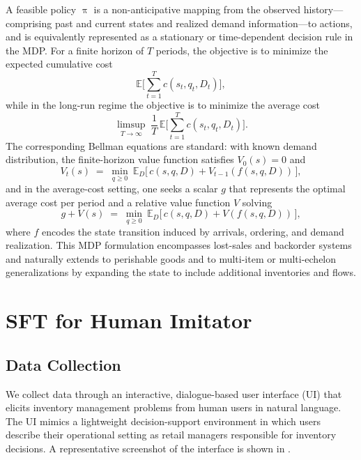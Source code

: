 \documentclass[mnsc,nonblindrev]{informs3_hide}
\newcommand{\policy}{\ensuremath{\uppi}}
\begin{document}
\begin{APPENDICES}
A feasible policy $\policy$ is a non-anticipative mapping from the observed history—comprising past and current states and realized demand information—to actions, and is equivalently represented as a stationary or time-dependent decision rule in the MDP. For a finite horizon of $T$ periods, the objective is to minimize the expected cumulative cost 
$$
\mathds{E}\Bigg[\sum_{t=1}^T c(s_t, q_t, D_t)\Bigg],
$$ 
while in the long-run regime the objective is to minimize the average cost 
\[
\limsup_{T\to\infty} \; \frac{1}{T} \,\mathds{E}\Bigg[\sum_{t=1}^T c(s_t, q_t, D_t)\Bigg].
\]
The corresponding Bellman equations are standard: with known demand distribution, the finite-horizon value function satisfies $V_0(s) = 0$ and
\[
V_t(s) \;=\; \min_{q \ge 0} \ \mathds{E}_D\big[\, c(s, q, D) + V_{t-1}(f(s, q, D)) \,\big],
\]
and in the average-cost setting, one seeks a scalar $g$ that represents the optimal average cost per period and a relative value function $V$ solving
\[
g + V(s) \;=\; \min_{q \ge 0} \ \mathds{E}_D\big[\, c(s, q, D) + V(f(s, q, D)) \,\big],
\]
where $f$ encodes the state transition induced by arrivals, ordering, and demand realization. This MDP formulation encompasses lost-sales and backorder systems and naturally extends to perishable goods and to multi-item or multi-echelon generalizations by expanding the state to include additional inventories and flows.
















\newpage
\section{SFT for Human Imitator}
\label{sec:SFT}

    \subsection{Data Collection}

    We collect data through an interactive, dialogue-based user interface (UI) that elicits inventory management problems from human users in natural language. The UI mimics a lightweight decision-support environment in which users describe their operational setting as retail managers responsible for inventory decisions. A representative screenshot of the interface is shown in .


\end{APPENDICES}
\end{document}
